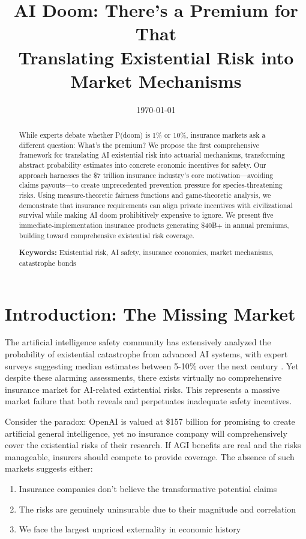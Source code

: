 \documentclass[11pt]{article}
\title{AI Doom: There's a Premium for That\\
\large Translating Existential Risk into Market Mechanisms}
\date{\today}
\begin{document}
\maketitle

\begin{abstract}
While experts debate whether P(doom) is 1\% or 10\%, insurance markets ask a different question: What's the premium? We propose the first comprehensive framework for translating AI existential risk into actuarial mechanisms, transforming abstract probability estimates into concrete economic incentives for safety. Our approach harnesses the \$7 trillion insurance industry's core motivation---avoiding claims payouts---to create unprecedented prevention pressure for species-threatening risks. Using measure-theoretic fairness functions and game-theoretic analysis, we demonstrate that insurance requirements can align private incentives with civilizational survival while making AI doom prohibitively expensive to ignore. We present five immediate-implementation insurance products generating \$40B+ in annual premiums, building toward comprehensive existential risk coverage.

\textbf{Keywords:} Existential risk, AI safety, insurance economics, market mechanisms, catastrophe bonds
\end{abstract}

\section{Introduction: The Missing Market}

The artificial intelligence safety community has extensively analyzed the probability of existential catastrophe from advanced AI systems, with expert surveys suggesting median estimates between 5-10\% over the next century \citep{grace2018ai}. Yet despite these alarming assessments, there exists virtually no comprehensive insurance market for AI-related existential risks. This represents a massive market failure that both reveals and perpetuates inadequate safety incentives.

Consider the paradox: OpenAI is valued at \$157 billion for promising to create artificial general intelligence, yet no insurance company will comprehensively cover the existential risks of their research. If AGI benefits are real and the risks manageable, insurers should compete to provide coverage. The absence of such markets suggests either:

\begin{enumerate}
   \item Insurance companies don't believe the transformative potential claims
   \item The risks are genuinely uninsurable due to their magnitude and correlation
   \item We face the largest unpriced externality in economic history
\end{enumerate}
\end{document}
